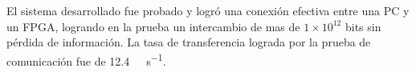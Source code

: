 El sistema desarrollado fue probado y logró una conexión efectiva entre una PC y un FPGA, logrando en la prueba un intercambio de mas de $1 \times 10^{12}$ bits sin pérdida de información. La tasa de transferencia lograda por la prueba de comunicación fue de \SI{12,4}{\mega\bit\per\second}.


%
%
%
